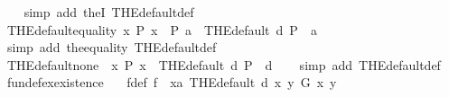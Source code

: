 \begin{isabellebody}
%
\isadelimproof
\ \ %
\endisadelimproof
%
\isatagproof
{}\isamarkupfalse%
\ {\isacharparenleft}{\kern0pt}simp\ add{\isacharcolon}{\kern0pt}\ theI{\isacharprime}{\kern0pt}\ THE{\isacharunderscore}{\kern0pt}default{\isacharunderscore}{\kern0pt}def{\isacharparenright}{\kern0pt}%
\endisatagproof
{\isafoldproof}%
%
\isadelimproof
\isanewline
%
\endisadelimproof
\isanewline
{}\isamarkupfalse%
\ THE{\isacharunderscore}{\kern0pt}default{}{\isacharunderscore}{\kern0pt}equality{\isacharcolon}{\kern0pt}\ {\isachardoublequoteopen}{\isasymexists}{\isacharbang}{\kern0pt}x{\isachardot}{\kern0pt}\ P\ x\ {\isasymLongrightarrow}\ P\ a\ {\isasymLongrightarrow}\ THE{\isacharunderscore}{\kern0pt}default\ d\ P\ {\isacharequal}{\kern0pt}\ a{\isachardoublequoteclose}\isanewline
%
\isadelimproof
\ \ %
\endisadelimproof
%
\isatagproof
{}\isamarkupfalse%
\ {\isacharparenleft}{\kern0pt}simp\ add{\isacharcolon}{\kern0pt}\ the{}{\isacharunderscore}{\kern0pt}equality\ THE{\isacharunderscore}{\kern0pt}default{\isacharunderscore}{\kern0pt}def{\isacharparenright}{\kern0pt}%
\endisatagproof
{\isafoldproof}%
%
\isadelimproof
\isanewline
%
\endisadelimproof
\isanewline
{}\isamarkupfalse%
\ THE{\isacharunderscore}{\kern0pt}default{\isacharunderscore}{\kern0pt}none{\isacharcolon}{\kern0pt}\ {\isachardoublequoteopen}{\isasymnot}\ {\isacharparenleft}{\kern0pt}{\isasymexists}{\isacharbang}{\kern0pt}x{\isachardot}{\kern0pt}\ P\ x{\isacharparenright}{\kern0pt}\ {\isasymLongrightarrow}\ THE{\isacharunderscore}{\kern0pt}default\ d\ P\ {\isacharequal}{\kern0pt}\ d{\isachardoublequoteclose}\isanewline
%
\isadelimproof
\ \ %
\endisadelimproof
%
\isatagproof
{}\isamarkupfalse%
\ {\isacharparenleft}{\kern0pt}simp\ add{\isacharcolon}{\kern0pt}\ THE{\isacharunderscore}{\kern0pt}default{\isacharunderscore}{\kern0pt}def{\isacharparenright}{\kern0pt}%
\endisatagproof
{\isafoldproof}%
%
\isadelimproof
\isanewline
%
\endisadelimproof
\isanewline
\isanewline
{}\isamarkupfalse%
\ fundef{\isacharunderscore}{\kern0pt}ex{}{\isacharunderscore}{\kern0pt}existence{\isacharcolon}{\kern0pt}\isanewline
\ \ \ f{\isacharunderscore}{\kern0pt}def{\isacharcolon}{\kern0pt}\ {\isachardoublequoteopen}f\ {\isasymequiv}\ {\isacharparenleft}{\kern0pt}{\isasymlambda}x{\isacharcolon}{\kern0pt}{\isacharcolon}{\kern0pt}{\isacharprime}{\kern0pt}a{\isachardot}{\kern0pt}\ THE{\isacharunderscore}{\kern0pt}default\ {\isacharparenleft}{\kern0pt}d\ x{\isacharparenright}{\kern0pt}\ {\isacharparenleft}{\kern0pt}{\isasymlambda}y{\isachardot}{\kern0pt}\ G\ x\ y{\isacharparenright}{\kern0pt}{\isacharparenright}{\kern0pt}{\isachardoublequoteclose}\isanewline

\end{isabellebody}
